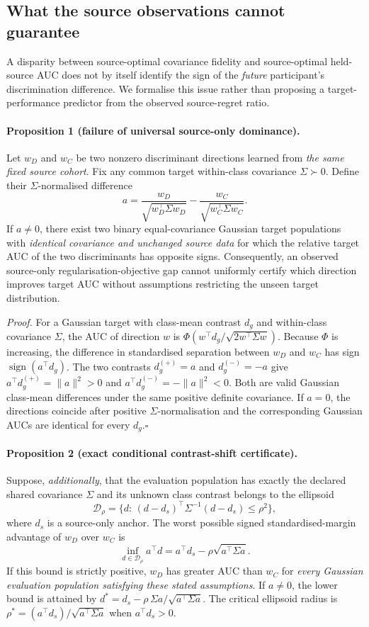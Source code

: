 \subsection{What the source observations cannot guarantee}
\label{sec:v15-identifiability}
A disparity between source-optimal covariance fidelity and source-optimal
held-source AUC does not by itself identify the sign of the
\emph{future} participant's discrimination difference. We formalise
this issue rather than proposing a target-performance predictor from
the observed source-regret ratio.

\paragraph{Proposition 1 (failure of universal source-only dominance).}
Let $w_D$ and $w_C$ be two nonzero discriminant directions learned from
\emph{the same fixed source cohort}. Fix any common target within-class
covariance $\Sigma\succ0$. Define their $\Sigma$-normalised difference
\[
 a=\frac{w_D}{\sqrt{w_D^\top\Sigma w_D}}
   -\frac{w_C}{\sqrt{w_C^\top\Sigma w_C}}.
\]
If $a\ne0$, there exist two binary equal-covariance Gaussian target
populations with \emph{identical covariance and unchanged source data}
for which the relative target AUC of the two discriminants has opposite
signs. Consequently, an observed source-only regularisation-objective
gap cannot uniformly certify which direction improves target AUC
without assumptions restricting the unseen target distribution.

\emph{Proof.}
For a Gaussian target with class-mean contrast $d_g$ and within-class
covariance $\Sigma$, the AUC of direction $w$ is
$\Phi\!\left(w^\top d_g/\sqrt{2w^\top\Sigma w}\right)$.
Because $\Phi$ is increasing, the difference in standardised
separation between $w_D$ and $w_C$ has sign
$\operatorname{sign}(a^\top d_g)$. The two contrasts
$d_g^{(+)}=a$ and $d_g^{(-)}=-a$ give $a^\top d_g^{(+)}
=\|a\|^2>0$ and $a^\top d_g^{(-)}=-\|a\|^2<0$.
Both are valid Gaussian class-mean differences under the same
positive definite covariance. If $a=0$, the directions coincide
after positive $\Sigma$-normalisation and the corresponding
Gaussian AUCs are identical for every $d_g$.\hfill$\square$

\paragraph{Proposition 2 (exact conditional contrast-shift certificate).}
Suppose, \emph{additionally}, that the evaluation population has exactly
the declared shared covariance $\Sigma$ and its unknown class contrast
belongs to the ellipsoid
\[
 \mathcal D_\rho=
 \{d:\,(d-d_s)^\top\Sigma^{-1}(d-d_s)\le\rho^2\},
\]
where $d_s$ is a source-only anchor. The worst possible signed
standardised-margin advantage of $w_D$ over $w_C$ is
\[
 \boxed{
 \inf_{d\in\mathcal D_\rho}
 a^\top d
 =
 a^\top d_s-\rho\sqrt{a^\top\Sigma a}.
 }
\]
If this bound is strictly positive, $w_D$ has greater AUC than
$w_C$ for \emph{every Gaussian evaluation population satisfying
these stated assumptions}. If $a\ne0$, the lower bound is attained
by $d^*=d_s-\rho\,\Sigma a/\sqrt{a^\top\Sigma a}$.
The critical ellipsoid radius is
$\rho^*=(a^\top d_s)/\sqrt{a^\top\Sigma a}$ when
$a^\top d_s>0$.

